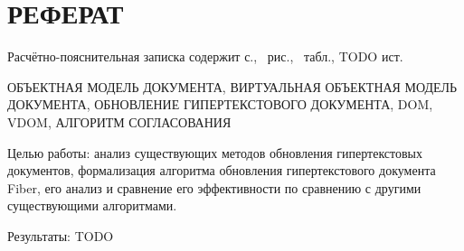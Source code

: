 \section*{РЕФЕРАТ}

Расчётно-пояснительная записка содержит \pageref{LastPage} с., \totalfigures\ рис., \totaltables\ табл., TODO ист.

ОБЪЕКТНАЯ МОДЕЛЬ ДОКУМЕНТА, ВИРТУАЛЬНАЯ ОБЪЕКТНАЯ МОДЕЛЬ ДОКУМЕНТА, ОБНОВЛЕНИЕ ГИПЕРТЕКСТОВОГО ДОКУМЕНТА, DOM, VDOM, АЛГОРИТМ СОГЛАСОВАНИЯ

Целью работы: анализ существующих методов обновления гипертекстовых документов, формализация алгоритма обновления гипертекстового документа Fiber, его анализ и сравнение его эффективности по сравнению с другими существующими алгоритмами.


Результаты: TODO


\pagebreak